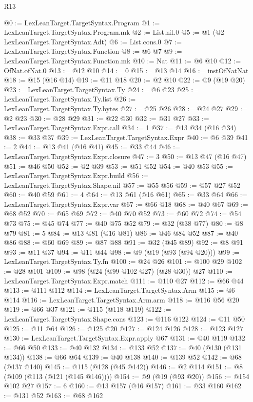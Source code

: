\begin{lexlean}{R13}
\begin{coremodule}
@0 := LexLeanTarget.TargetSyntax.Program
@1 := LexLeanTarget.TargetSyntax.Program.mk
@2 := List.nil.{0}
@5 := @1 (@2 LexLeanTarget.TargetSyntax.Adt)
@6 := List.cons.{0}
@7 := LexLeanTarget.TargetSyntax.Function
@8 := @6 @7
@9 := LexLeanTarget.TargetSyntax.Function.mk
@10 := Nat
@11 := @6 @10
@12 := OfNat.ofNat.{0}
@13 := @12 @10
@14 := 0
@15 := @13 @14
@16 := instOfNatNat
@18 := @15 (@16 @14)
@19 := @11 @18
@20 := @2 @10
@22 := @9 (@19 @20)
@23 := LexLeanTarget.TargetSyntax.Ty
@24 := @6 @23
@25 := LexLeanTarget.TargetSyntax.Ty.list
@26 := LexLeanTarget.TargetSyntax.Ty.bytes
@27 := @25 @26
@28 := @24 @27
@29 := @2 @23
@30 := @28 @29
@31 := @22 @30
@32 := @31 @27
@33 := LexLeanTarget.TargetSyntax.Expr.call
@34 := 1
@37 := @13 @34 (@16 @34)
@38 := @33 @37
@39 := LexLeanTarget.TargetSyntax.Expr
@40 := @6 @39
@41 := 2
@44 := @13 @41 (@16 @41)
@45 := @33 @44
@46 := LexLeanTarget.TargetSyntax.Expr.closure
@47 := 3
@50 := @13 @47 (@16 @47)
@51 := @46 @50
@52 := @2 @39
@53 := @51 @52
@54 := @40 @53
@55 := LexLeanTarget.TargetSyntax.Expr.build
@56 := LexLeanTarget.TargetSyntax.Shape.nil
@57 := @55 @56
@59 := @57 @27 @52
@60 := @40 @59
@61 := 4
@64 := @13 @61 (@16 @61)
@65 := @33 @64
@66 := LexLeanTarget.TargetSyntax.Expr.var
@67 := @66 @18
@68 := @40 @67
@69 := @68 @52
@70 := @65 @69
@72 := @40 @70 @52
@73 := @60 @72
@74 := @54 @73
@75 := @45 @74
@77 := @40 @75 @52
@79 := @32 (@38 @77)
@80 := @8 @79
@81 := 5
@84 := @13 @81 (@16 @81)
@86 := @46 @84 @52
@87 := @40 @86
@88 := @60 @69
@89 := @87 @88
@91 := @32 (@45 @89)
@92 := @8 @91
@93 := @11 @37
@94 := @11 @44
@98 := @9 (@19 (@93 (@94 @20)))
@99 := LexLeanTarget.TargetSyntax.Ty.fn
@100 := @24 @26
@101 := @100 @29
@102 := @28 @101
@109 := @98 (@24 (@99 @102 @27) (@28 @30)) @27
@110 := LexLeanTarget.TargetSyntax.Expr.match
@111 := @110 @27
@112 := @66 @44
@113 := @111 @112
@114 := LexLeanTarget.TargetSyntax.Arm
@115 := @6 @114
@116 := LexLeanTarget.TargetSyntax.Arm.arm
@118 := @116 @56 @20
@119 := @66 @37
@121 := @115 (@118 @119)
@122 := LexLeanTarget.TargetSyntax.Shape.cons
@123 := @116 @122
@124 := @11 @50
@125 := @11 @64
@126 := @125 @20
@127 := @124 @126
@128 := @123 @127
@130 := LexLeanTarget.TargetSyntax.Expr.apply @67
@131 := @40 @119
@132 := @66 @50
@133 := @40 @132
@134 := @133 @52
@137 := @40 (@130 (@131 @134))
@138 := @66 @64
@139 := @40 @138
@140 := @139 @52
@142 := @68 (@137 @140)
@145 := @115 (@128 (@45 @142))
@146 := @2 @114
@151 := @8 (@109 (@113 (@121 (@145 @146))))
@154 := @9 (@19 (@93 @20))
@156 := @154 @102 @27
@157 := 6
@160 := @13 @157 (@16 @157)
@161 := @33 @160
@162 := @131 @52
@163 := @68 @162

\end{coremodule}
\end{lexlean}
